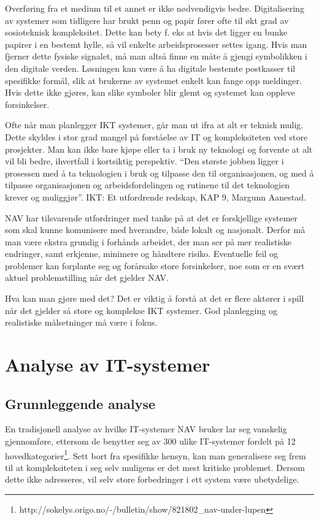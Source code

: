 \documentclass[informationsecurity]{gucmasterproject}
\begin{document}
Overføring fra et medium til et annet er ikke nødvendigvis bedre. Digitalisering av systemer som tidligere har brukt penn og papir fører ofte til økt grad av sosioteknisk kompleksitet. Dette kan bety f. eks at hvis det ligger en bunke papirer i en bestemt hylle, så vil enkelte arbeidsprosesser settes igang. Hvis man fjerner dette fysiske signalet, må man altså finne en måte å gjengi symbolikken i den digitale verden. Løsningen kan være å ha digitale bestemte postkasser til spesifikke formål, slik at brukerne av systemet enkelt kan fange opp meldinger. Hvis dette ikke gjøres, kan slike symboler blir glemt og systemet kan oppleve forsinkelser.

Ofte når man planlegger IKT systemer, går man ut ifra at alt er teknisk mulig. Dette skyldes i stor grad mangel på forståelse av IT og kompleksiteten ved store prosjekter. Man kan ikke bare kjøpe eller ta i bruk ny teknologi og forvente at alt vil bli bedre, ihvertfall i kortsiktig perspektiv. “Den største jobben ligger i prosessen med å ta  teknologien i bruk og tilpasse den  til organisasjonen, og med å tilpasse organisasjonen og arbeidsfordelingen og rutinene til det teknologien krever og muliggjør”. IKT: Et utfordrende redskap, KAP 9, Margunn Aanestad.

NAV har tilsvarende utfordringer med tanke på at det er forskjellige systemer som skal kunne komunisere med hverandre, både lokalt og nasjonalt. Derfor må man være ekstra grundig i forhånds arbeidet, der man ser på mer realistiske endringer, samt erkjenne, minimere og håndtere risiko. Eventuelle feil og problemer kan forplante seg og forårsake store forsinkelser, noe som er en svært  aktuel problemstilling når det gjelder NAV. 

Hva kan man gjøre med det? Det er viktig å forstå at det er flere aktører i spill når det gjelder så store og komplekse IKT systemer. God planlegging og realistiske målsetninger må være i fokus.




\chapter{Analyse av IT-systemer}
\section{Grunnleggende analyse}
En tradisjonell analyse av hvilke IT-systemer NAV bruker lar seg vanskelig gjennomføre, ettersom de benytter seg av 300 ulike IT-systemer fordelt på 12 hovedkategorier\footnote{http://sokelys.origo.no/-/bulletin/show/821802\_nav-under-lupen}. Sett bort fra spesifikke hensyn, kan man generalisere seg frem til at kompleksiteten i seg selv muligens er det mest kritiske problemet. Dersom dette ikke adresseres, vil selv store forbedringer i ett system være ubetydelige.
\end{document}
